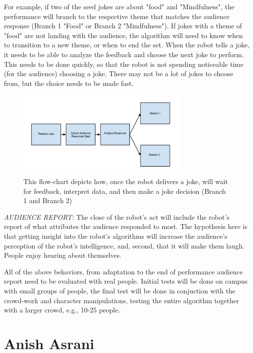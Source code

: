 \documentclass[onecolumn, draftclsnofoot,10pt, compsoc]{IEEEtran}
\begin{document}
For example, if two of the seed jokes are about "food" and "Mindfulness", the performance will branch to the respective theme that matches the audience response (Branch 1 "Food" or Branch 2 "Mindfulness"). If jokes with a theme of "food" are not landing with the audience, the algorithm will need to know when to transition to a new theme, or when to end the set. When the robot tells a joke, it needs to be able to analyze the feedback and choose the next joke to perform. This needs to be done quickly, so that the robot is not spending noticeable time (for the audience) choosing a joke. There may not be a lot of jokes to choose from, but the choice needs to be made fast.

\begin{figure}[H]
  \centering
  \includegraphics[width=0.75\textwidth,height=0.75\textheight,keepaspectratio]{fig1}
  \caption{ This flow-chart depicts how, once the robot delivers a joke, will wait for feedback, interpret data, and then make a joke decision (Branch 1 and Branch 2)}
\end{figure}

\textit{AUDIENCE REPORT:} The close of the robot's act will include the robot's report of what attributes the audience responded to most. The hypothesis here is that getting insight into the robot's algorithms will increase the audience's perception of the robot's intelligence, and, second, that it will make them laugh. People enjoy hearing about themselves.

All of the above behaviors, from adaptation to the end of performance audience report need to be evaluated with real people. Initial tests will be done on campus with small groups of people, the final test will be done in conjuction with the crowd-work and character manipulations, testing the entire algorithm together with a larger crowd, e.g., 10-25 people.


\section{Anish Asrani}
\end{document}
